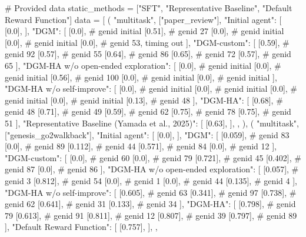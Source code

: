     # Provided data
    static_methods = ["SFT", "Representative Baseline", "Default Reward Function"]
    data = [
        (
            "multitask",
            ["paper_review"],
            {
                "Initial agent": [
                    [0.0],
                ],
                "DGM": [
                    [0.0],  # genid initial
                    [0.51],  # genid 27
                    [0.0],  # genid initial
                    [0.0],  # genid initial
                    [0.0],  # genid 53, timing out
                ],
                "DGM-custom": [
                    [0.59],  # genid 92
                    [0.57],  # genid 55
                    [0.64],  # genid 86
                    [0.65],  # genid 72
                    [0.57],  # genid 65
                ],
                "DGM-HA w/o open-ended exploration": [
                    [0.0],  # genid initial
                    [0.0],  # genid initial
                    [0.56],  # genid 100
                    [0.0],  # genid initial
                    [0.0],  # genid initial
                ],
                "DGM-HA w/o self-improve": [
                    [0.0],  # genid initial
                    [0.0],  # genid initial
                    [0.0],  # genid initial
                    [0.0],  # genid initial
                    [0.13],  # genid 48
                ],
                "DGM-HA": [
                    [0.68],  # genid 48
                    [0.71],  # genid 49
                    [0.59],  # genid 62
                    [0.75],  # genid 78
                    [0.75],  # genid 51
                ],
                "Representative Baseline (Yamada et al., 2025)": [
                    [0.63],
                ],
            },
        ),
        (
            "multitask",
            ["genesis_go2walkback"],
            {
                "Initial agent": [
                    [0.0],
                ],
                "DGM": [
                    [0.059],  # genid 83
                    [0.0],  # genid 89
                    [0.112],  # genid 44
                    [0.571],  # genid 84
                    [0.0],  # genid 12
                ],
                "DGM-custom": [
                    [0.0],  # genid 60
                    [0.0],  # genid 79
                    [0.721],  # genid 45
                    [0.402],  # genid 87
                    [0.0],  # genid 86
                ],
                "DGM-HA w/o open-ended exploration": [
                    [0.057],  # genid 3
                    [0.812],  # genid 54
                    [0.0],  # genid 1
                    [0.0],  # genid 44
                    [0.135],  # genid 4
                ],
                "DGM-HA w/o self-improve": [
                    [0.605],  # genid 63
                    [0.341],  # genid 97
                    [0.738],  # genid 62
                    [0.641],  # genid 31
                    [0.133],  # genid 34
                ],
                "DGM-HA": [
                    [0.798],  # genid 79
                    [0.613],  # genid 91
                    [0.811],  # genid 12
                    [0.807],  # genid 39
                    [0.797],  # genid 89
                ],
                "Default Reward Function": [
                    [0.757],
                ],
            },
